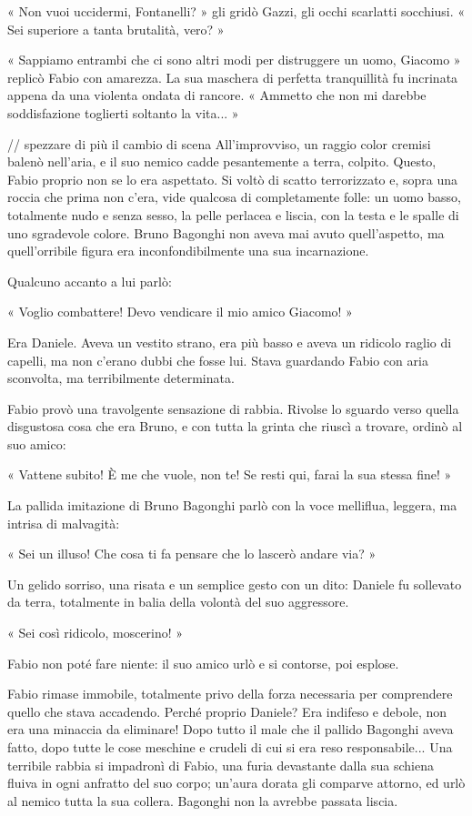 « Non vuoi uccidermi, Fontanelli? » gli gridò Gazzi, gli occhi scarlatti socchiusi. « Sei superiore a tanta brutalità, vero? »

« Sappiamo entrambi che ci sono altri modi per distruggere un uomo, Giacomo » replicò Fabio con amarezza. La sua maschera di perfetta tranquillità fu incrinata appena da una violenta ondata di rancore. « Ammetto che non mi darebbe soddisfazione toglierti soltanto la vita... »

// spezzare di più il cambio di scena
All'improvviso, un raggio color cremisi balenò nell'aria, e il suo nemico cadde pesantemente a terra, colpito. Questo, Fabio proprio non se lo era aspettato. Si voltò di scatto terrorizzato e, sopra una roccia che prima non c'era, vide qualcosa di completamente folle: un uomo basso, totalmente nudo e senza sesso, la pelle perlacea e liscia, con la testa e le spalle di uno sgradevole colore. Bruno Bagonghi non aveva mai avuto quell'aspetto, ma quell'orribile figura era inconfondibilmente una sua incarnazione.

Qualcuno accanto a lui parlò:

« Voglio combattere! Devo vendicare il mio amico Giacomo! »

Era Daniele. Aveva un vestito strano, era più basso e aveva un ridicolo raglio di capelli, ma non c'erano dubbi che fosse lui. Stava guardando Fabio con aria sconvolta, ma terribilmente determinata.

Fabio provò una travolgente sensazione di rabbia. Rivolse lo sguardo verso quella disgustosa cosa che era Bruno, e con tutta la grinta che riuscì a trovare, ordinò al suo amico:

« Vattene subito! È me che vuole, non te! Se resti qui, farai la sua stessa fine! »

La pallida imitazione di Bruno Bagonghi parlò con la voce melliflua, leggera, ma intrisa di malvagità:

« Sei un illuso! Che cosa ti fa pensare che lo lascerò andare via? »

Un gelido sorriso, una risata e un semplice gesto con un dito: Daniele fu sollevato da terra, totalmente in balia della volontà del suo aggressore.

« Sei così ridicolo, moscerino! »

Fabio non poté fare niente: il suo amico urlò e si contorse, poi esplose.

Fabio rimase immobile, totalmente privo della forza necessaria per comprendere quello che stava accadendo. Perché proprio Daniele? Era indifeso e debole, non era una minaccia da eliminare! Dopo tutto il male che il pallido Bagonghi aveva fatto, dopo tutte le cose meschine e crudeli di cui si era reso responsabile... Una terribile rabbia si impadronì di Fabio, una furia devastante dalla sua schiena fluiva in ogni anfratto del suo corpo; un'aura dorata gli comparve attorno, ed urlò al nemico tutta la sua collera. Bagonghi non la avrebbe passata liscia.

